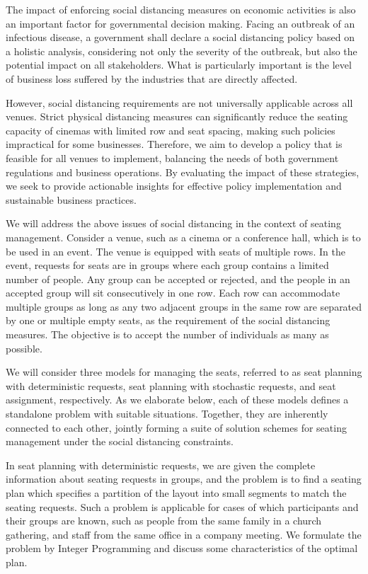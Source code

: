 The impact of enforcing social distancing measures on economic activities is also an important factor for governmental decision making. Facing an outbreak of an infectious disease, a government shall declare a social distancing policy based on a holistic analysis, considering not only the severity of the outbreak, but also the potential impact on all stakeholders. What is particularly important is the level of business loss suffered by the industries that are directly affected.  

However, social distancing requirements are not universally applicable across all venues. Strict physical distancing measures can significantly reduce the seating capacity of cinemas with limited row and seat spacing, making such policies impractical for some businesses. Therefore, we aim to develop a policy that is feasible for all venues to implement, balancing the needs of both government regulations and business operations. By evaluating the impact of these strategies, we seek to provide actionable insights for effective policy implementation and sustainable business practices.


We will address the above issues of social distancing in the context of seating management. Consider a venue, such as a cinema or a conference hall, which is to be used in an event. The venue is equipped with seats of multiple rows. In the event, requests for seats are in groups where each group contains a limited number of people. Any group can be accepted or rejected, and the people in an accepted group  will sit consecutively in one row. Each row can accommodate multiple groups as long as any two adjacent groups in the same row are separated by one or multiple empty seats, as the requirement of the social distancing measures. The objective is to accept the number of individuals as many as possible.

We will consider three models for managing the seats, referred to as seat planning with deterministic requests, seat planning with stochastic requests, and seat assignment, respectively. As we elaborate below, each of these models defines a standalone problem with suitable situations. Together, they are inherently connected to each other, jointly forming a suite of solution schemes for seating management under the social distancing constraints.

In seat planning with deterministic requests, we are given the complete information about seating requests in groups, and the problem is to find a seating plan which specifies a partition of the layout into small segments to match the seating requests. Such a problem is applicable for cases of which participants and their groups are known, such as people from the same family in a church gathering, and staff from the same office in a company meeting. We formulate the problem by Integer Programming and discuss some characteristics of the optimal plan.
 
